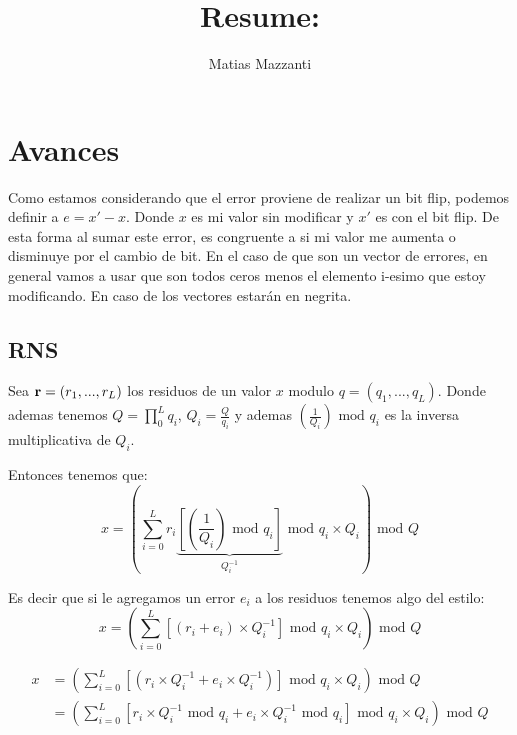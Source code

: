 \documentclass[12pt, oneside]{article}
\title{Resume: }
\author{Matias Mazzanti}
\date{}
\begin{document}
\maketitle
\tableofcontents

\section{Avances}

Como estamos considerando que el error proviene de realizar un bit flip, podemos definir a $e = x' - x$.
Donde $x$ es mi valor sin modificar y $x'$ es con el bit flip.
De esta forma al sumar este error, es congruente a si mi valor me aumenta o disminuye por el cambio
de bit.
En el caso de que son un vector de errores, en general vamos a usar que son todos ceros menos
el elemento i-esimo que estoy modificando.
En caso de los vectores estarán en negrita.

\subsection{RNS}

Sea $\bold{r} = (r_1, ..., r_L)$ los residuos de un valor $x$ modulo $q = (q_1, ...,q_L)$.
Donde ademas tenemos $Q = \prod_0^L q_i$, $Q_i = \frac{Q}{q_i}$ y ademas $\left(\frac{1}{Q_{i}}\right)\text{ mod } q_i$ es la inversa multiplicativa de $Q_i$.

Entonces tenemos que:
\begin{equation}
    x = \left(\sum_{i=0}^L r_i\underbrace{\left[\left(\frac{1}{Q_{i}}\right)\text{ mod } q_i\right]}_{Q_i^{-1}} \text{ mod } q_i \times Q_i\right) \text{ mod } Q
\end{equation}

Es decir que si le agregamos un error $e_i$ a los residuos tenemos algo del estilo:
\begin{equation}
    x = \left(\sum_{i=0}^L \left[(r_i+e_i)\times Q_i^{-1}\right]\text{ mod } q_i \times Q_i\right) \text{ mod } Q
\end{equation}

\begin{equation}
    \begin{split}
        x &= \left(\sum_{i=0}^L \left[(r_i\times Q_i^{-1} +e_i\times Q_i^{-1})\right]\text{ mod } q_i \times Q_i\right) \text{ mod } Q \\
          &= \left(\sum_{i=0}^L \left[r_i\times Q_i^{-1} \text{ mod } q_i +e_i\times Q_i^{-1}\text{ mod } q_i \right]\text{ mod } q_i \times Q_i\right) \text{ mod } Q \\
    \end{split}
\end{equation}
\end{document}
